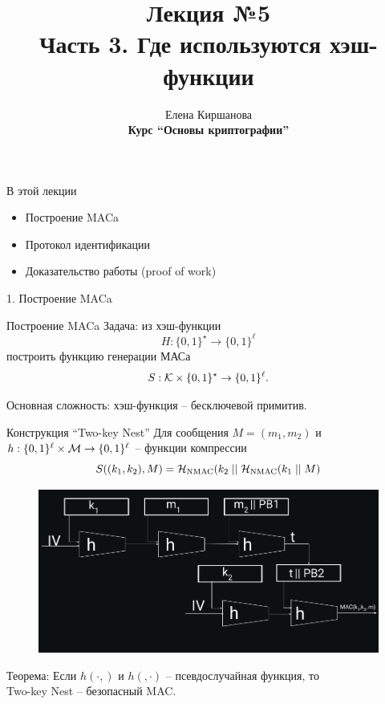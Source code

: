 \documentclass[usenames,dvipsnames,8pt,aspectratio=169]{beamer}
\title{Лекция №5 \\[10pt]
	Часть 3. Где используются хэш-функции}
\date{ Елена Киршанова \\  \textbf{Курс ``Основы криптографии''} \\  }
\begin{document}
	
\begin{frame}
	\titlepage
\end{frame}

\begin{frame}{В этой лекции}
\Large
	\begin{itemize}
		\itemsep 10pt
		\item Построение MACa
		\item Протокол идентификации
		\item Доказательство работы (proof of work)
	\end{itemize}
\end{frame}

\begin{frame}

\begin{LARGE}
	
	
	\color{Orange}
	1. Построение MACa
	
\end{LARGE}
\end{frame}

\begin{frame}{Построение MACa}
\Large
{\color{Orange} Задача:} из хэш-функции 
\[H: \{0,1\}^\star \rightarrow \{0,1\}^{\ell}\] построить функцию генерации МАСа 
\[S: \mathcal{K} \times \{0,1\}^\star \rightarrow \{0,1\}^{\ell}.\]

\vspace{20pt}

Основная сложность: хэш-функция -- бесключевой примитив. 

\end{frame}

\begin{frame}{Конструкция ``Two-key Nest''}
\Large
Для сообщения $M = (m_1, m_2)$ и $h: \{0,1\}^\ell \times \mathcal{M} \rightarrow  \{0,1\}^\ell $ -- функции компрессии
\[
	S((k_1, k_2), M) = \mathcal{H}_{\text{NMAC}}(k_2 \; ||  \; \mathcal{H}_{\text{NMAC}}(k_1 \; || \; M)
\]

\begin{figure}
	\hspace{-60pt}
	\includegraphics[scale=0.35]{TwoKeyNest}
\end{figure}
\vspace{-30pt}
{\color{Orange} Теорема:} Если $h(\cdot, )$ и $h(, \cdot)$ -- псевдослучайная функция, то \\ Two-key Nest -- безопасный MAC.

\end{frame}
\end{document}
